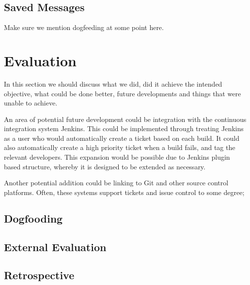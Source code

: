 \documentclass[a4paper]{l3proj}
\begin{document}
\section{Saved Messages}
\label{savedMessages}

Make sure we mention dogfeeding at some point here.

\chapter{Evaluation}
\label{evaluation}

In this section we should discuss what we did, did it achieve the intended objective, what could be done better, 
future developments and things that were unable to achieve.

An area of potential future development could be integration with the continuous integration system Jenkins.  This could be implemented through treating Jenkins as a user who would automatically create a ticket based on each build.  It could also automatically create a high priority ticket when a build fails, and tag the relevant developers.  This expansion would be possible due to Jenkins plugin based structure, whereby it is designed to be extended as necessary.

Another potential addition could be linking to Git and other source control platforms. Often, these systems support tickets and issue control to some degree; 

\section{Dogfooding}
\label{dogfooding}


\section{External Evaluation}
\label{externalEvaluation}


\section{Retrospective}
\label{retrospective}
\end{document}
